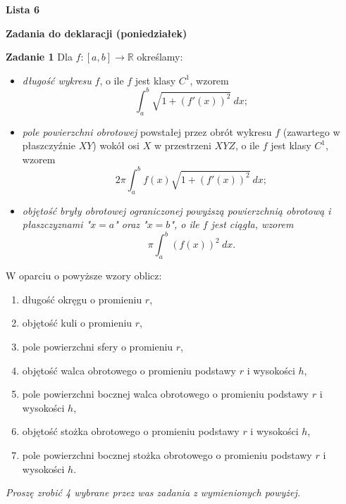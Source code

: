 \documentclass[a4paper,11pt]{article}
\begin{document}
\begin{center}
  {\large\textbf{Lista 6}}
\end{center}

\hrulefill
\begin{center}
    \textbf{Zadania do deklaracji (poniedziałek)}
\end{center}

\bigskip

\textbf{Zadanie 1} Dla $f:[a,b] \to \mathbb{R}$ określamy:

\begin{itemize}
    \item \textit{długość wykresu} $f$, o ile $f$ jest klasy $C^1$, wzorem 
    $$\int_a^b \sqrt{1+(f'(x))^2} ~dx;$$
    \item \textit{pole powierzchni obrotowej} powstałej przez obrót wykresu $f$ 
    (zawartego w płaszczyźnie $XY$) wokół osi $X$ w przestrzeni $XYZ$, 
    o ile $f$ jest klasy $C^1$, wzorem
    $$2\pi \int_a^b f(x) \sqrt{1+(f'(x))^2}~dx;$$
    \item \textit{objętość bryły obrotowej ograniczonej powyższą powierzchnią 
    obrotową i płaszczyznami "$x=a$" oraz "$x=b$", o ile $f$ jest ciągła, wzorem}
    $$\pi \int_a^b (f(x))^2 ~dx.$$
\end{itemize}

W oparciu o powyższe wzory oblicz:
\begin{enumerate}
    \item  długość okręgu o promieniu $r$,
    \item objętość kuli o promieniu $r$,
    \item pole powierzchni sfery o promieniu $r$,
    \item  objętość walca obrotowego o promieniu podstawy $r$ i wysokości $h$,
    \item pole powierzchni bocznej walca obrotowego o promieniu podstawy $r$ i wysokości $h$,
    \item objętość stożka obrotowego o promieniu podstawy $r$ i wysokości $h$,
    \item pole powierzchni bocznej stożka obrotowego o promieniu podstawy $r$ i wysokości $h$.
\end{enumerate}

\textit{Proszę zrobić 4 wybrane przez was zadania z wymienionych powyżej.} 

\bigskip
\end{document}
